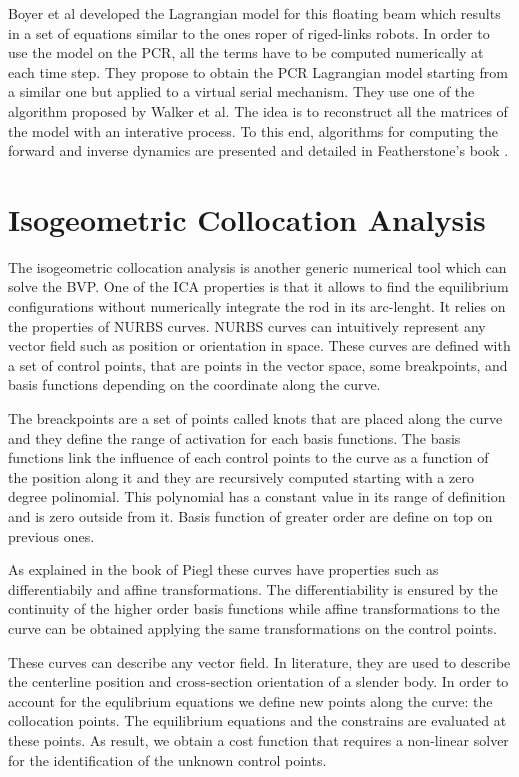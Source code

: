 \documentclass{thesisreport}
\begin{document}
 Boyer et al\cite{boyer_dynamics_2019} developed the Lagrangian model for this floating beam which results in a set of equations similar to the ones roper of riged-links robots. In order to use the model on the PCR, all the terms have to be computed numerically at each time step. They propose to obtain the PCR Lagrangian model starting from a similar one but applied to a virtual serial mechanism. They use one of the algorithm proposed by Walker et al\cite{walker_efficient_1982}. The idea is to reconstruct all the matrices of the model with an interative process. To this end, algorithms for computing the forward and inverse dynamics are presented and detailed in Featherstone's book \cite{featherstone_rigid_2008}.

 
 \section{Isogeometric Collocation Analysis}
 The isogeometric collocation analysis is another generic numerical tool which can solve the BVP. One of the ICA properties is that it allows to find the equilibrium configurations without numerically integrate the rod in its arc-lenght. 
 It relies on the properties of NURBS curves\cite{piegl_nurbs_1997}. NURBS curves can intuitively represent any vector field such as position or orientation in space. These curves are defined with a set of control points, that are points in the vector space, some breakpoints, and basis functions depending on the coordinate along the curve.
 
  The breackpoints are a set of points called knots that are placed along the curve and they define the range of activation for each basis functions. The basis functions link the influence of each control points to the curve as a function of the position along it and they are recursively computed starting with a zero degree polinomial. This polynomial has a constant value in its range of definition and is zero outside from it. Basis function of greater order are define on top on previous ones. 
  
 As explained in the book of Piegl \cite{piegl_nurbs_1997} these curves have properties such as differentiabily and affine transformations. The differentiability is ensured by the continuity of the higher order basis functions while affine transformations to the curve can be obtained applying the same transformations on the control points.
 
 These curves can describe any vector field. In literature\cite{weeger_isogeometric_2017-1}, they are used to describe the centerline position and cross-section orientation of a slender body. In order to account for the equlibrium equations we define new points along the curve: the collocation points. The equilibrium equations and the constrains are evaluated at these points. As result, we obtain a cost function that requires a non-linear solver for the identification of the unknown control points.
 
\end{document}
